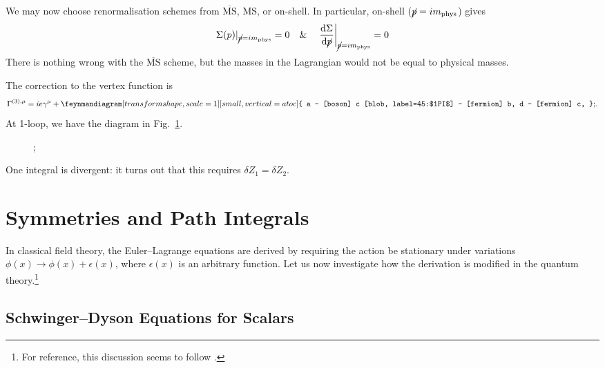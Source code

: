 We may now choose renormalisation schemes from $\overline{\text{MS}}{}$, MS, or on-shell.
In particular, on-shell ($\cancel{p} = i m_{\text{phys}}$) gives
\begin{equation}
  \Sigma(p) \rvert_{\cancel{p} = i m_{\text{phys}}} = 0 \quad \& \quad
  \left.\dv{\Sigma}{\cancel{p}} \right\rvert_{\cancel{p} = i m_{\text{phys}}} = 0
\end{equation}
There is nothing wrong with the $\overline{\text{MS}}{}$ scheme, but the masses in the Lagrangian would not be equal to physical masses. 

The correction to the vertex function is
\begin{equation}
  \Gamma^{(3), \mu}  = i e \gamma^{\mu} + 
  \begin{gathered}
    \feynmandiagram[transform shape, scale=1][small, vertical=a to c] {
      a -- [boson] c [blob, label=45:$1PI$] -- [fermion] b,
      d -- [fermion] c,
    };
  \end{gathered}.
\end{equation}
At 1-loop, we have the diagram in Fig.~\ref{fig:l18d1}.
\begin{figure}[tbhp]
  \centering
  ;
  \caption{}
  \label{fig:l18d1}
\end{figure}
One integral is divergent: it turns out that this requires $\delta Z_1 = \delta Z_2$.

\chapter{Symmetries and Path Integrals}%
\label{cha:symmetries_and_path_integrals}

In classical field theory, the Euler--Lagrange equations are derived by requiring the action be stationary under variations $\phi(x) \to \phi(x) + \epsilon(x)$, where $\epsilon(x)$ is an arbitrary function.
Let us now investigate how the derivation is modified in the quantum theory.\footnote{For reference, this discussion seems to follow \cite[Cha.~14.7]{schwartz}.}

\section{Schwinger--Dyson Equations for Scalars}%
\label{sec:schwinger_dyson_equations_and_scalars}

